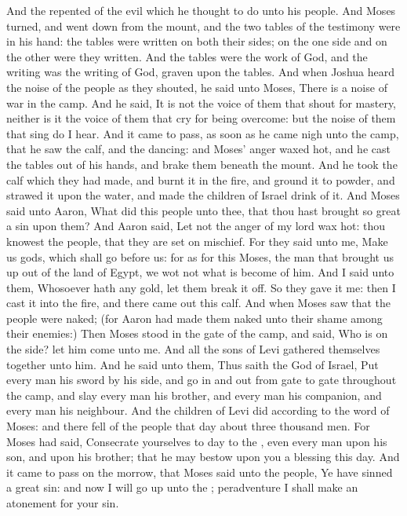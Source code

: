 \begin{biblechapter}
\verse And the \LORD repented of the evil which he thought to do unto his people.
\verse And Moses turned, and went down from the mount, and the two tables of the testimony were in his hand: the tables were written on both their sides; on the one side and on the other were they written.
\verse And the tables were the work of God, and the writing was the writing of God, graven upon the tables.
\verse And when Joshua heard the noise of the people as they shouted, he said unto Moses, There is a noise of war in the camp.
\verse And he said, It is not the voice of them that shout for mastery, neither is it the voice of them that cry for being overcome: but the noise of them that sing do I hear.
\verse And it came to pass, as soon as he came nigh unto the camp, that he saw the calf, and the dancing: and Moses' anger waxed hot, and he cast the tables out of his hands, and brake them beneath the mount.
\verse And he took the calf which they had made, and burnt it in the fire, and ground it to powder, and strawed it upon the water, and made the children of Israel drink of it.
\verse And Moses said unto Aaron, What did this people unto thee, that thou hast brought so great a sin upon them?
\verse And Aaron said, Let not the anger of my lord wax hot: thou knowest the people, that they are set on mischief.
\verse For they said unto me, Make us gods, which shall go before us: for as for this Moses, the man that brought us up out of the land of Egypt, we wot not what is become of him.
\verse And I said unto them, Whosoever hath any gold, let them break it off. So they gave it me: then I cast it into the fire, and there came out this calf.
\verse And when Moses saw that the people were naked; (for Aaron had made them naked unto their shame among their enemies:)
\verse Then Moses stood in the gate of the camp, and said, Who is on the \LORDs side? let him come unto me. And all the sons of Levi gathered themselves together unto him.
\verse And he said unto them, Thus saith the \LORD God of Israel, Put every man his sword by his side, and go in and out from gate to gate throughout the camp, and slay every man his brother, and every man his companion, and every man his neighbour.
\verse And the children of Levi did according to the word of Moses: and there fell of the people that day about three thousand men.
\verse For Moses had said, Consecrate yourselves to day to the \LORD, even every man upon his son, and upon his brother; that he may bestow upon you a blessing this day.
\verse And it came to pass on the morrow, that Moses said unto the people, Ye have sinned a great sin: and now I will go up unto the \LORD; peradventure I shall make an atonement for your sin.

\end{biblechapter}
